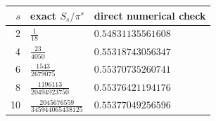 \begin{tabular}{rll}
\toprule
$s$ & exact $S_s/\pi^s$ & direct numerical check \\
\midrule
2 & $\frac{1}{18}$ & $0.54831135561608$ \\
4 & $\frac{23}{4050}$ & $0.55318743056347$ \\
6 & $\frac{1543}{2679075}$ & $0.55370735260741$ \\
8 & $\frac{1196113}{20494923750}$ & $0.55376421194176$ \\
10 & $\frac{2045676559}{345944065438125}$ & $0.55377049256596$ \\
\bottomrule
\end{tabular}
